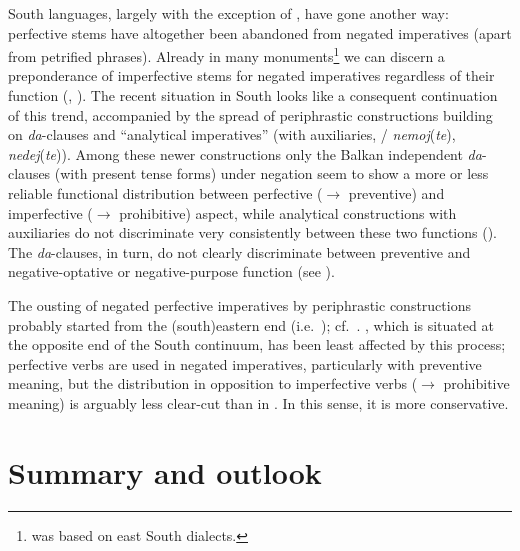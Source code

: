 \documentclass[output=paper,colorlinks,citecolor=brown]{langscibook}
\begin{document}
South  languages, largely with the exception of , have gone another way: perfective stems have altogether been abandoned from negated imperatives (apart from petrified phrases). Already in many  monuments\footnote{ was based on east South  dialects.} we can discern a preponderance of imperfective stems for negated imperatives regardless of their function (\citealt[71]{Kurzova-Ribarova1972}, \citealt[70--73]{Večerka1996}). The recent situation in South  looks like a consequent continuation of this trend, accompanied by the spread of periphrastic constructions building on \textit{da}-clauses and ``analytical imperatives'' (with auxiliaries, / \textit{nemoj}(\textit{te}),  \textit{nedej}(\textit{te})). Among these newer constructions only the Balkan  independent \textit{da}-clauses (with present tense forms) under negation seem to show a more or less reliable functional distribution between perfective (${\rightarrow}$ preventive) and imperfective (${\rightarrow}$ prohibitive) aspect, while analytical constructions with auxiliaries do not discriminate very consistently between these two functions (). The \textit{da}-clauses, in turn, do not clearly discriminate between preventive and negative-optative or negative-purpose function (see ).

The ousting of negated perfective imperatives by periphrastic constructions probably started from the (south)eastern end (i.e.\ ); cf.\ \citet{Ivić1958}. , which is situated at the opposite end of the South  continuum, has been least affected by this process; perfective verbs are used in negated imperatives, particularly with preventive meaning, but the distribution in opposition to imperfective verbs (${\rightarrow}$ prohibitive meaning) is arguably less clear-cut than in . In this sense, it is more conservative.



\section{Summary and outlook}
\label{sec:summary}
\end{document}
